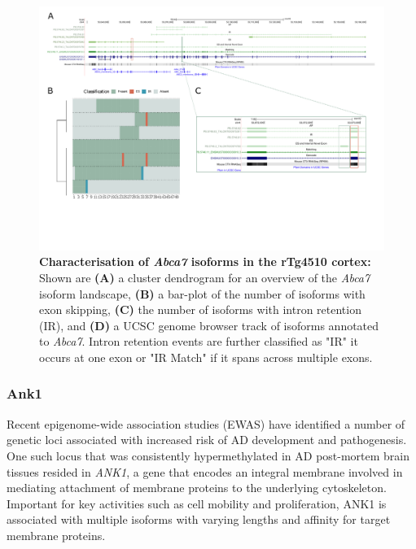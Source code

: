 \begin{landscape}
	\begin{figure}[htp]
		\centering
		\captionsetup{width=1.3\textwidth}
		\includegraphics[page=2,trim={0 1.5cm 0 0},scale = 0.85]{Figures/TargetGenes_Annotation_Landscape.pdf}
		\caption[Characterisation of \textit{Abca7} isoforms in the rTg4510 cortex]%
		{\textbf{Characterisation of \textit{Abca7} isoforms in the rTg4510 cortex:} Shown are \textbf{(A)} a cluster dendrogram for an overview of the \textit{Abca7} isoform landscape, \textbf{(B)} a bar-plot of the number of isoforms with exon skipping, \textbf{(C)} the number of isoforms with intron retention (IR), and \textbf{(D)} a UCSC genome browser track of isoforms annotated to \textit{Abca7}. Intron retention events are further classified as "IR" it occurs at one exon or "IR Match" if it spans across multiple exons. }    
		\label{fig:abca7}
	\end{figure}
\end{landscape}
\restoregeometry

\subsubsection{Ank1} 
\label{ch6: ank1}
Recent epigenome-wide association studies (EWAS) have identified a number of genetic loci associated with increased risk of AD development and pathogenesis\cite{Smith2019, Lunnon2014}. One such locus that was consistently hypermethylated in AD post-mortem brain tissues resided in \textit{ANK1}, a gene that encodes an integral membrane involved in mediating attachment of membrane proteins to the underlying cytoskeleton\cite{Smith2019, Lunnon2014}. Important for key activities such as cell mobility and proliferation, ANK1 is associated with multiple isoforms with varying lengths and affinity for target membrane proteins.

